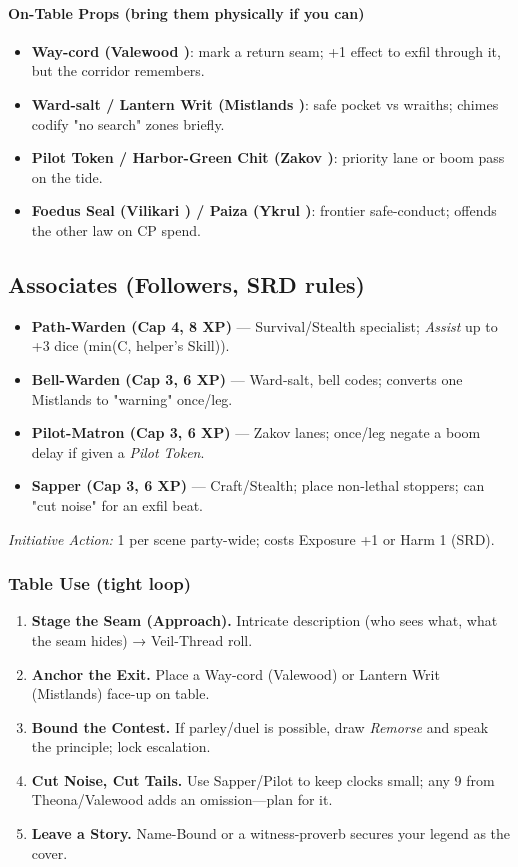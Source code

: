 \paragraph{On-Table Props (bring them physically if you can)}
\begin{itemize}
  \item \textbf{Way-cord (Valewood \SuitDiamond{})}: mark a return seam; +1 effect to exfil through it, but the corridor remembers.
  \item \textbf{Ward-salt / Lantern Writ (Mistlands \SuitDiamond{})}: safe pocket vs wraiths; chimes codify "no search" zones briefly.
  \item \textbf{Pilot Token / Harbor-Green Chit (Zakov \SuitDiamond{})}: priority lane or boom pass on the tide.
  \item \textbf{Foedus Seal (Vilikari \SuitDiamond{}) / Paiza (Ykrul \SuitDiamond{})}: frontier safe-conduct; offends the other law on CP spend.
\end{itemize}

\subsection{Associates (Followers, SRD rules)}
\begin{itemize}
  \item \textbf{Path-Warden (Cap 4, 8 XP)} — Survival/Stealth specialist; \emph{Assist} up to +3 dice (min(C, helper's Skill)).
  \item \textbf{Bell-Warden (Cap 3, 6 XP)} — Ward-salt, bell codes; converts one Mistlands \SuitClub{} to "warning" once/leg.
  \item \textbf{Pilot-Matron (Cap 3, 6 XP)} — Zakov lanes; once/leg negate a boom delay if given a \emph{Pilot Token}.
  \item \textbf{Sapper (Cap 3, 6 XP)} — Craft/Stealth; place non-lethal stoppers; can "cut noise" for an exfil beat.
\end{itemize}
\emph{Initiative Action:} 1 per scene party-wide; costs Exposure +1 or Harm 1 (SRD).

\subsubsection{Table Use (tight loop)}
\begin{enumerate}
  \item \textbf{Stage the Seam (Approach).} Intricate description (who sees what, what the seam hides) → Veil-Thread roll.
  \item \textbf{Anchor the Exit.} Place a Way-cord (Valewood) or Lantern Writ (Mistlands) \SuitDiamond{} face-up on table.
  \item \textbf{Bound the Contest.} If parley/duel is possible, draw \emph{Remorse} and speak the principle; lock escalation.
  \item \textbf{Cut Noise, Cut Tails.} Use Sapper/Pilot to keep clocks small; any 9 from Theona/Valewood adds an omission—plan for it.
  \item \textbf{Leave a Story.} Name-Bound or a witness-proverb secures your legend as the cover.
\end{enumerate}

